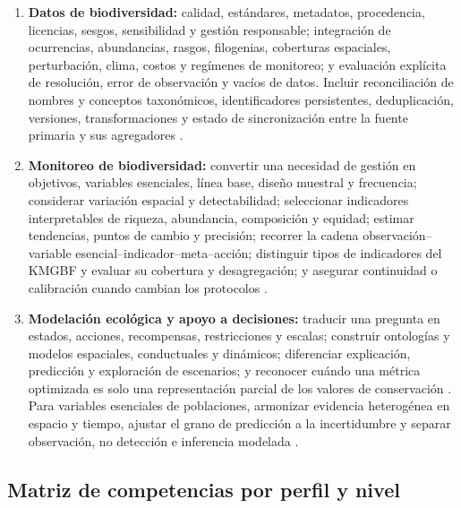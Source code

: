 \documentclass[11pt,a4paper]{article}
\begin{document}
\begin{enumerate}
  reduzca la comprensión compartida del proyecto
  \citep{zheng2026scientific}.
  \item \textbf{Datos de biodiversidad:} calidad, estándares, metadatos,
  procedencia, licencias, sesgos, sensibilidad y gestión responsable; integración
  de ocurrencias, abundancias, rasgos, filogenias, coberturas espaciales,
  perturbación, clima, costos y regímenes de monitoreo; y evaluación explícita de
  resolución, error de observación y vacíos de datos. Incluir reconciliación de
  nombres y conceptos taxonómicos, identificadores persistentes, deduplicación,
  versiones, transformaciones y estado de sincronización entre la fuente primaria
  y sus agregadores
  \citep{silvestro2022improving,strannegard2026ecosystem,feng2022databases}.
  \item \textbf{Monitoreo de biodiversidad:} convertir una necesidad de gestión en
  objetivos, variables esenciales, línea base, diseño muestral y frecuencia;
  considerar variación espacial y detectabilidad; seleccionar indicadores
  interpretables de riqueza, abundancia, composición y equidad; estimar tendencias,
  puntos de cambio y precisión; recorrer la cadena observación--variable
  esencial--indicador--meta--acción; distinguir tipos de indicadores del KMGBF y
  evaluar su cobertura y desagregación; y asegurar continuidad o calibración
  cuando cambian los protocolos
  \citep{paton2009biodiversity,buckland2005monitoring,
  affinito2024monitoring,affinito2025coverage,jetz2019ebv}.
  \item \textbf{Modelación ecológica y apoyo a decisiones:} traducir una pregunta
  en estados, acciones, recompensas, restricciones y escalas; construir ontologías
  y modelos espaciales, conductuales y dinámicos; diferenciar explicación,
  predicción y exploración de escenarios; y reconocer cuándo una métrica
  optimizada es solo una representación parcial de los valores de conservación
  \citep{silvestro2022improving,strannegard2026ecosystem}. Para variables
  esenciales de poblaciones, armonizar evidencia heterogénea en espacio y tiempo,
  ajustar el grano de predicción a la incertidumbre y separar observación,
  no detección e inferencia modelada \citep{jetz2019ebv}.
\end{enumerate}

\subsection{Matriz de competencias por perfil y nivel}
\end{document}
